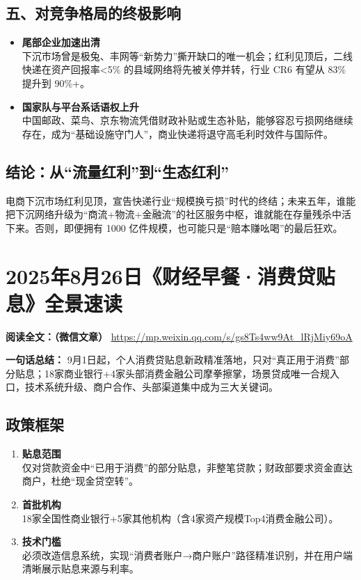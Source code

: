 \subsection{五、对竞争格局的终极影响}
\begin{itemize}
  \item \textbf{尾部企业加速出清}  \\
  下沉市场曾是极兔、丰网等“新势力”撕开缺口的唯一机会；红利见顶后，二线快递在资产回报率<5\% 的县域网络将先被关停并转，行业 CR6 有望从 83\% 提升到 90\%+。
  \item \textbf{国家队与平台系话语权上升}  \\
  中国邮政、菜鸟、京东物流凭借财政补贴或生态补贴，能够容忍亏损网络继续存在，成为“基础设施守门人”，商业快递将退守高毛利时效件与国际件。
\end{itemize}

\subsection{结论：从“流量红利”到“生态红利”}
电商下沉市场红利见顶，宣告快递行业“规模换亏损”时代的终结；未来五年，谁能把下沉网络升级为“商流+物流+金融流”的社区服务中枢，谁就能在存量残杀中活下来。否则，即便拥有 1000 亿件规模，也可能只是“赔本赚吆喝”的最后狂欢。


\section{2025年8月26日《财经早餐·消费贷贴息》全景速读}
\vspace{1cm}
\noindent\textbf{阅读全文：（微信文章）} \url{https://mp.weixin.qq.com/s/gs8Ts4ww9At_lRjMiy69oA}

\textbf{一句话总结：}  
9月1日起，个人消费贷贴息新政精准落地，{\color{red}只对“真正用于消费”部分贴息}；18家商业银行+4家头部消费金融公司摩拳擦掌，场景贷成唯一合规入口，技术系统升级、商户合作、头部渠道集中成为三大关键词。

\subsection{政策框架}
\begin{enumerate}[leftmargin=*, nosep]
    \item \textbf{贴息范围}  \\
    {\color{red}仅对贷款资金中“已用于消费”的部分贴息，非整笔贷款}；财政部要求资金直达商户，杜绝“现金贷空转”。
    \item \textbf{首批机构}  \\
    18家全国性商业银行+5家其他机构（含4家资产规模Top4消费金融公司）。
    \item \textbf{技术门槛}  \\
    必须改造信息系统，实现“消费者账户→商户账户”路径精准识别，并在用户端清晰展示贴息来源与利率。
\end{enumerate}


